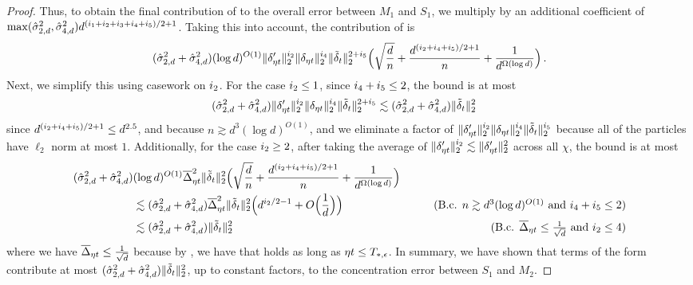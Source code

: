 \begin{proof}
Thus, to obtain the final contribution of  to the overall error between $M_1$ and $S_1$, we multiply by an additional coefficient of $\max(\hat{\sigma}_{2, d}^2, \hat{\sigma}_{4, d}^2) d^{(i_{1} + i_{2} + i_{3} + i_{4} + i_{5})/2 + 1}$. Taking this into account, the contribution of  is
\begin{align}
(\hat{\sigma}_{2, d}^2 + \hat{\sigma}_{4, d}^2) (\log d)^{O(1)} \|\delta_{\eta t}'\|_2^{i_{2}} \|\delta_{\eta t}\|_2^{i_{4}} \|{\tilde{\delta}}_t\|_2^{2 + i_{5}} \Big(\sqrt{\frac{d}{n}} + \frac{d^{(i_{2} + i_{4} + i_{5})/2 + 1}}{n} + \frac{1}{d^{\Omega(\log d)}} \Big) \,.
\end{align}
Next, we simplify this using casework on $i_{2}$. For the case $i_{2} \leq 1$, since $i_{4} + i_{5} \leq 2$, the bound is at most
\begin{align}
(\hat{\sigma}_{2, d}^2 + \hat{\sigma}_{4, d}^2) \|\delta_{\eta t}'\|_2^{i_{2}} \|\delta_{\eta t}\|_2^{i_{4}} \|{\tilde{\delta}}_t\|_2^{2 + i_{5}}
& \lesssim (\hat{\sigma}_{2, d}^2 + \hat{\sigma}_{4, d}^2) \|{\tilde{\delta}}_t\|_2^2
\end{align}
since $d^{(i_{2} + i_{4} + i_{5})/2 + 1} \leq d^{2.5}$, and because $n \gtrsim d^3 (\log d)^{O(1)}$, and we eliminate a factor of $\|\delta_{\eta t}'\|_2^{i_{2}} \|\delta_{\eta t}\|_2^{i_{4}} \|{\tilde{\delta}}_t\|_2^{i_{5}}$ because all of the particles have $\ell_2$ norm at most $1$. Additionally, for the case $i_{2} \geq 2$, after taking the average of $\|\delta'_{\eta t}\|_2^{i_{2}} \lesssim \|\delta'_{\eta t}\|_2^2$ across all $\chi$, the bound is at most
\begin{align}
(\sigmaCoeffTwo^2 + \sigmaCoeffFour^2) & (\log d)^{O(1)} \deltaBar_{\eta t}^2 \|\deltaSingleGD_t\|_2^2 \Big(\sqrt{\frac{d}{n}} + \frac{d^{(\idx{2} + \idx{4} + \idx{5})/2 + 1}}{n} + \frac{1}{d^{\Omega(\log d)}} \Big) \\
& \lesssim (\sigmaCoeffTwo^2 + \sigmaCoeffFour^2) \deltaBar_{\eta t}^2 \|\deltaSingleGD_t\|_2^2 \Big(d^{\idx{2}/2 - 1} + O\Big(\frac{1}{d}\Big) \Big)
& \tag{B.c. $n \gtrsim d^3 (\log d)^{O(1)}$ and $\idx{4} + \idx{5} \leq 2$} \\
& \lesssim (\sigmaCoeffTwo^2 + \sigmaCoeffFour^2) \|\deltaSingleGD_t\|_2^2
& \tag{B.c. $\deltaBar_{\eta t} \leq \frac{1}{\sqrt{d}}$ and $\idx{2} \leq 4$}
\end{align}
where we have $\overline{\Delta}_{\eta t} \leq \frac{1}{\sqrt{d}}$ because by , we have that  holds as long as $\eta t \leq T_{*, \epsilon}$. In summary, we have shown that terms of the form  contribute at most $(\hat{\sigma}_{2, d}^2 + \hat{\sigma}_{4, d}^2) \|{\tilde{\delta}}_t\|_2^2$, up to constant factors, to the concentration error between $S_1$ and $M_2$.


\end{proof}
